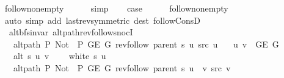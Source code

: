 \begin{isabellebody}
\ follow{\isacharunderscore}{\kern0pt}non{\isacharunderscore}{\kern0pt}empty\isanewline
\ \ \ \ \isamarkupfalse%
\ simp\isanewline
\ \ \isamarkupfalse%
\ {\isacharquery}{\kern0pt}case\isanewline
\ \ \ \ \isamarkupfalse%
\ follow{\isacharunderscore}{\kern0pt}non{\isacharunderscore}{\kern0pt}empty\isanewline
\ \ \ \ \isamarkupfalse%
\ {\isacharparenleft}{\kern0pt}auto\ simp\ add{\isacharcolon}{\kern0pt}\ last{\isacharunderscore}{\kern0pt}rev{\isacharbrackleft}{\kern0pt}symmetric{\isacharbrackright}{\kern0pt}\ dest{\isacharcolon}{\kern0pt}\ follow{\isacharunderscore}{\kern0pt}ConsD{\isacharparenright}{\kern0pt}\isanewline
{}\isamarkupfalse%
%
\endisatagproof
{\isafoldproof}%
%
\isadelimproof
\isanewline
%
\endisadelimproof
\isanewline
{}\isamarkupfalse%
\ {\isacharparenleft}{\kern0pt}\ alt{\isacharunderscore}{\kern0pt}bfs{\isacharunderscore}{\kern0pt}invar{\isacharparenright}{\kern0pt}\ alt{\isacharunderscore}{\kern0pt}path{\isacharunderscore}{\kern0pt}rev{\isacharunderscore}{\kern0pt}follow{\isacharunderscore}{\kern0pt}snocI{\isacharcolon}{\kern0pt}\isanewline
\ \ \ {\isachardoublequoteopen}alt{\isacharunderscore}{\kern0pt}path\ P{\isacharprime}{\kern0pt}{\isacharprime}{\kern0pt}\ {\isacharparenleft}{\kern0pt}Not\ {\isasymcirc}\ P{\isacharprime}{\kern0pt}{\isacharprime}{\kern0pt}{\isacharparenright}{\kern0pt}\ {\isacharparenleft}{\kern0pt}G{\isachardot}{\kern0pt}E\ G{\isacharparenright}{\kern0pt}\ {\isacharparenleft}{\kern0pt}rev{\isacharunderscore}{\kern0pt}follow\ {\isacharparenleft}{\kern0pt}parent\ s{\isacharparenright}{\kern0pt}\ u{\isacharparenright}{\kern0pt}\ src\ u{\isachardoublequoteclose}\isanewline
\ \ \ {\isachardoublequoteopen}{\isacharbraceleft}{\kern0pt}u{\isacharcomma}{\kern0pt}\ v{\isacharbraceright}{\kern0pt}\ {\isasymin}\ G{\isachardot}{\kern0pt}E\ G{\isachardoublequoteclose}\isanewline
\ \ \ {\isachardoublequoteopen}alt\ s\ u\ v{\isachardoublequoteclose}\isanewline
\ \ \ {\isachardoublequoteopen}{\isasymnot}\ white\ s\ u{\isachardoublequoteclose}\isanewline
\ \ \ {\isachardoublequoteopen}alt{\isacharunderscore}{\kern0pt}path\ P{\isacharprime}{\kern0pt}{\isacharprime}{\kern0pt}\ {\isacharparenleft}{\kern0pt}Not\ {\isasymcirc}\ P{\isacharprime}{\kern0pt}{\isacharprime}{\kern0pt}{\isacharparenright}{\kern0pt}\ {\isacharparenleft}{\kern0pt}G{\isachardot}{\kern0pt}E\ G{\isacharparenright}{\kern0pt}\ {\isacharparenleft}{\kern0pt}rev{\isacharunderscore}{\kern0pt}follow\ {\isacharparenleft}{\kern0pt}parent\ s{\isacharparenright}{\kern0pt}\ u\ {\isacharat}{\kern0pt}\ {\isacharbrackleft}{\kern0pt}v{\isacharbrackright}{\kern0pt}{\isacharparenright}{\kern0pt}\ src\ v{\isachardoublequoteclose}\isanewline

\end{isabellebody}
